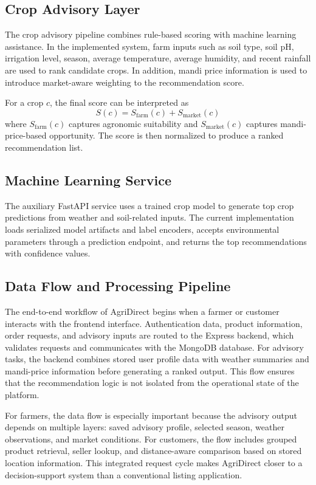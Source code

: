 \documentclass[conference]{IEEEtran}
\begin{document}
\subsection{Crop Advisory Layer}
The crop advisory pipeline combines rule-based scoring with machine learning assistance. In the implemented system, farm inputs such as soil type, soil pH, irrigation level, season, average temperature, average humidity, and recent rainfall are used to rank candidate crops. In addition, mandi price information is used to introduce market-aware weighting to the recommendation score.

For a crop $c$, the final score can be interpreted as
\begin{equation}
S(c) = S_{\text{farm}}(c) + S_{\text{market}}(c)
\end{equation}
where $S_{\text{farm}}(c)$ captures agronomic suitability and $S_{\text{market}}(c)$ captures mandi-price-based opportunity. The score is then normalized to produce a ranked recommendation list.

\subsection{Machine Learning Service}
The auxiliary FastAPI service uses a trained crop model to generate top crop predictions from weather and soil-related inputs. The current implementation loads serialized model artifacts and label encoders, accepts environmental parameters through a prediction endpoint, and returns the top recommendations with confidence values.

\subsection{Data Flow and Processing Pipeline}
The end-to-end workflow of AgriDirect begins when a farmer or customer interacts with the frontend interface. Authentication data, product information, order requests, and advisory inputs are routed to the Express backend, which validates requests and communicates with the MongoDB database. For advisory tasks, the backend combines stored user profile data with weather summaries and mandi-price information before generating a ranked output. This flow ensures that the recommendation logic is not isolated from the operational state of the platform.

For farmers, the data flow is especially important because the advisory output depends on multiple layers: saved advisory profile, selected season, weather observations, and market conditions. For customers, the flow includes grouped product retrieval, seller lookup, and distance-aware comparison based on stored location information. This integrated request cycle makes AgriDirect closer to a decision-support system than a conventional listing application.
\end{document}
